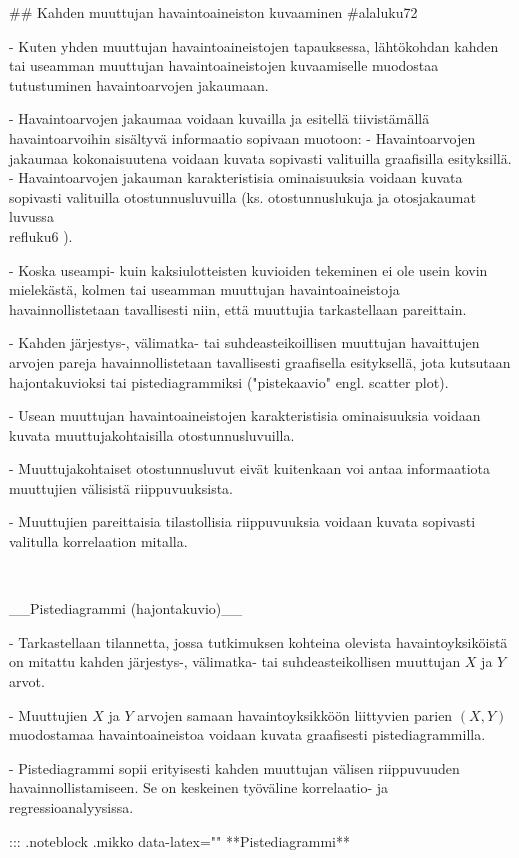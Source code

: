\documentclass[
]{book}
\begin{document}
\begin{itemize}
## Kahden muuttujan havaintoaineiston kuvaaminen {#alaluku72}

- Kuten yhden muuttujan havaintoaineistojen tapauksessa, lähtökohdan kahden tai useamman muuttujan havaintoaineistojen kuvaamiselle muodostaa tutustuminen havaintoarvojen jakaumaan.

- Havaintoarvojen jakaumaa voidaan kuvailla ja esitellä tiivistämällä havaintoarvoihin sisältyvä informaatio sopivaan muotoon:
  - Havaintoarvojen jakaumaa kokonaisuutena voidaan kuvata sopivasti valituilla graafisilla esityksillä.
  - Havaintoarvojen jakauman karakteristisia ominaisuuksia voidaan kuvata sopivasti valituilla otostunnusluvuilla (ks. otostunnuslukuja ja otosjakaumat luvussa \\ref{luku6} ).

- Koska useampi- kuin kaksiulotteisten kuvioiden tekeminen ei ole usein kovin mielekästä, kolmen tai useamman muuttujan havaintoaineistoja havainnollistetaan tavallisesti niin, että muuttujia tarkastellaan pareittain.

- Kahden järjestys-, välimatka- tai suhdeasteikoillisen muuttujan havaittujen arvojen pareja havainnollistetaan tavallisesti graafisella esityksellä, jota kutsutaan hajontakuvioksi tai pistediagrammiksi ("pistekaavio" engl. scatter plot).

- Usean muuttujan havaintoaineistojen karakteristisia ominaisuuksia voidaan kuvata muuttujakohtaisilla otostunnusluvuilla.

- Muuttujakohtaiset otostunnusluvut eivät kuitenkaan voi antaa informaatiota muuttujien välisistä riippuvuuksista.

- Muuttujien pareittaisia tilastollisia riippuvuuksia voidaan kuvata sopivasti valitulla korrelaation mitalla.

\
\

__Pistediagrammi (hajontakuvio)__

- Tarkastellaan tilannetta, jossa tutkimuksen kohteina olevista havaintoyksiköistä on mitattu kahden järjestys-, välimatka- tai suhdeasteikollisen muuttujan $X$ ja $Y$ arvot.

- Muuttujien $X$ ja $Y$ arvojen samaan havaintoyksikköön liittyvien parien $(X,Y)$ muodostamaa havaintoaineistoa voidaan kuvata graafisesti pistediagrammilla.

- Pistediagrammi sopii erityisesti kahden muuttujan välisen riippuvuuden havainnollistamiseen. Se on keskeinen työväline korrelaatio- ja regressioanalyysissa.

::: {.noteblock .mikko data-latex="{}"}
**Pistediagrammi**  


\end{itemize}
\end{document}
